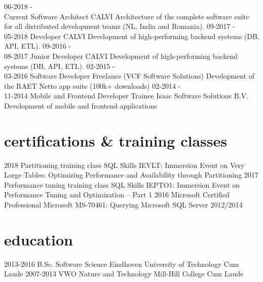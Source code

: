 \documentclass[]{friggeri-cv}
\begin{document}
\begin{entrylist}
  \entry
    {06-2018 -\\Current}
    {Software Architect}
    {CALVI}
    {Architecture of the complete software suite for all distributed development teams (NL, India and Romania).}
  \entry
    {09-2017 -\\05-2018}
    {Developer}
    {CALVI}
    {Development of high-performing backend systems (DB, API, ETL).}
  \entry
    {09-2016 -\\08-2017}
    {Junior Developer}
    {CALVI}
    {Development of high-performing backend systems (DB, API, ETL).}
  \entry
    {02-2015 -\\03-2016}
    {Software Developer}
    {Freelance (VCF Software Solutions)}
    {Development of the RAET Netto app suite (100k+ downloads)}
  \entry
    {02-2014 -\\11-2014}
    {Mobile and Frontend Developer Trainee}
    {Isaac Software Solutions B.V.}
    {Development of mobile and frontend applications}
\end{entrylist}

\section{certifications \& training classes}
\begin{entrylist}
  \entry
    {2018}
    {Partitioning training class}
    {SQL Skills}
    {IEVLT: Immersion Event on Very Large Tables: Optimizing Performance and Availability through Partitioning}
  \entry
    {2017}
    {Performance tuning training class}
    {SQL Skills}
    {IEPTO1: Immersion Event on Performance Tuning and Optimization – Part 1}
  \entry
    {2016}
    {Microsoft Certified Professional}
    {Microsoft}
    {MS-70461:  Querying Microsoft SQL Server 2012/2014}
\end{entrylist}

\section{education}
\begin{entrylist}
  \entry
    {2013-2016}
    {B.Sc. Software Science}
    {Eindhoven University of Technology}
    {Cum Laude}
  \entry
    {2007-2013}
    {VWO Nature and Technology}
    {Mill-Hill College}
    {Cum Laude}
\end{entrylist}
\end{document}
